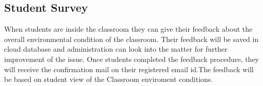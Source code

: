 \subsection{Student Survey}
When students are inside the classroom they can give their feedback about the overall environmental condition of the classroom. Their feedback will be saved in cloud database and administration can look into the matter for further improvement of the issue. Once students completed the feedback procedure, they will receive the confirmation mail on their registered email id.The feedback will be based on student view of the Classroom enviroment conditions.

